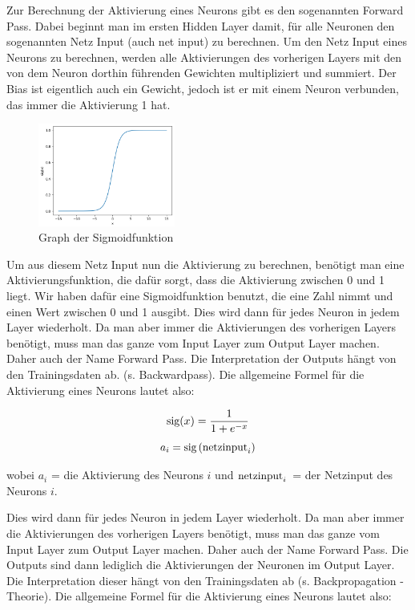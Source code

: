 \documentclass{scrartcl}
\begin{document}

	Zur Berechnung der Aktivierung eines Neurons gibt es den sogenannten Forward Pass. Dabei beginnt man im ersten Hidden Layer damit, für alle Neuronen den sogenannten Netz Input (auch net input) zu berechnen. Um den Netz Input eines Neurons zu berechnen, werden alle Aktivierungen des vorherigen Layers mit den von dem Neuron dorthin führenden Gewichten multipliziert und summiert. Der Bias ist eigentlich auch ein Gewicht, jedoch ist er mit einem Neuron verbunden, das immer die Aktivierung 1 hat.

	\begin{figure}
		\centering
		\includegraphics[width=0.4\textwidth]{pictures/sig_func.png}
		\caption{Graph der Sigmoidfunktion}
	\end{figure}

	Um aus diesem Netz Input nun die Aktivierung zu berechnen, benötigt man eine Aktivierungsfunktion, die dafür sorgt, dass die Aktivierung zwischen 0 und 1 liegt. Wir haben dafür eine Sigmoidfunktion benutzt, die eine Zahl nimmt und einen Wert zwischen 0 und 1 ausgibt. Dies wird dann für jedes Neuron in jedem Layer wiederholt. Da man aber immer die Aktivierungen des vorherigen Layers benötigt, muss man das ganze vom Input Layer zum Output Layer machen. Daher auch der Name Forward Pass. Die Interpretation der Outputs hängt von den Trainingsdaten ab. (s. Backwardpass). Die allgemeine Formel für die Aktivierung eines Neurons lautet also:
	

	{\Large
	\[
		\textrm{sig}(x)=\frac{1}{1+e^{-x}}
		\]
	\[
		a_i=\textrm{sig}\left({\textrm{netzinput}}_i \right)
		\]}
	
	wobei $a_i$ = die Aktivierung des Neurons $i$ und $\textrm{netzinput}_{i}$ = der Netzinput des Neurons $i$.

	Dies wird dann für jedes Neuron in jedem Layer wiederholt. Da man aber immer die Aktivierungen des vorherigen Layers benötigt, muss man das ganze vom Input Layer zum Output Layer machen. Daher auch der Name Forward Pass. Die Outputs sind dann lediglich die Aktivierungen der Neuronen im Output Layer. Die Interpretation dieser hängt von den Trainingsdaten ab (s. Backpropagation - Theorie). Die allgemeine Formel für die Aktivierung eines Neurons lautet also: 
\end{document}

